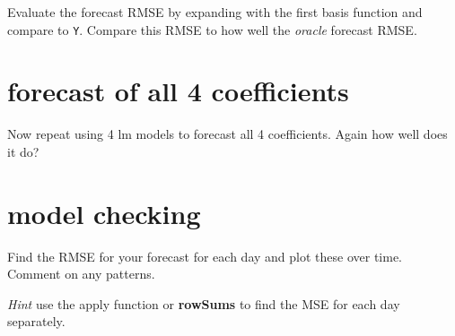 \documentclass[
]{article}
\begin{document}
Evaluate the forecast RMSE by expanding with the first basis function
and compare to \texttt{Y}. Compare this RMSE to how well the
\emph{oracle} forecast RMSE.

\hypertarget{forecast-of-all-4-coefficients}{%
\section{forecast of all 4
coefficients}\label{forecast-of-all-4-coefficients}}

Now repeat using 4 lm models to forecast all 4 coefficients. Again how
well does it do?

\hypertarget{model-checking}{%
\section{model checking}\label{model-checking}}

Find the RMSE for your forecast for each day and plot these over time.
Comment on any patterns.

\emph{Hint} use the apply function or \textbf{rowSums} to find the MSE
for each day separately.
\end{document}
